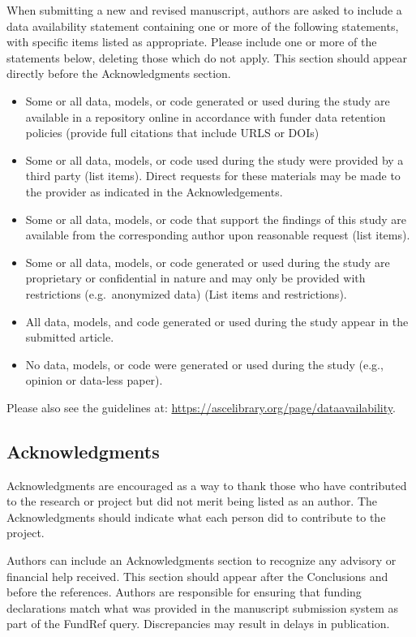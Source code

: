 \documentclass[
  NewProceedings,
  letterpaper]{./assets/ascelike-new}
\begin{document}
When submitting a new and revised manuscript, authors are asked to
include a data availability statement containing one or more of the
following statements, with specific items listed as appropriate. Please
include one or more of the statements below, deleting those which do not
apply. This section should appear directly before the Acknowledgments
section.

\begin{itemize}
\item
  Some or all data, models, or code generated or used during the study
  are available in a repository online in accordance with funder data
  retention policies (provide full citations that include URLS or DOIs)
\item
  Some or all data, models, or code used during the study were provided
  by a third party (list items). Direct requests for these materials may
  be made to the provider as indicated in the Acknowledgements.
\item
  Some or all data, models, or code that support the findings of this
  study are available from the corresponding author upon reasonable
  request (list items).
\item
  Some or all data, models, or code generated or used during the study
  are proprietary or confidential in nature and may only be provided
  with restrictions (e.g.~anonymized data) (List items and
  restrictions).
\item
  All data, models, and code generated or used during the study appear
  in the submitted article.
\item
  No data, models, or code were generated or used during the study
  (e.g., opinion or data-less paper).
\end{itemize}

Please also see the guidelines at:
\url{https://ascelibrary.org/page/dataavailability}.

\hypertarget{acknowledgments}{%
\subsection{Acknowledgments}\label{acknowledgments}}

Acknowledgments are encouraged as a way to thank those who have
contributed to the research or project but did not merit being listed as
an author. The Acknowledgments should indicate what each person did to
contribute to the project.

Authors can include an Acknowledgments section to recognize any advisory
or financial help received. This section should appear after the
Conclusions and before the references. Authors are responsible for
ensuring that funding declarations match what was provided in the
manuscript submission system as part of the FundRef query. Discrepancies
may result in delays in publication.
\end{document}
